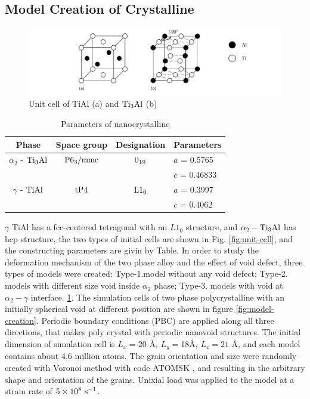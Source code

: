 \documentclass[materials,article,submit,moreauthors,pdftex,10pt,a4paper]{Definitions/mdpi}
\begin{document}
\subsection{Model Creation of Crystalline}
\begin{figure}[ht]
	\centering
	\includegraphics[width=1\linewidth]{img/tial-cell}
	\caption{Unit cell of \rm{TiAl} (a) and $\rm{Ti_3Al}$ (b)}
	\label{fig:tial-cell}
\end{figure}

\begin{table}[ht]
	\caption{Parameters of nanocrystalline}
	\centering
	\begin{tabular}{c c c l}
	\toprule
	\textbf{Phase}			& {Space group}		& {Designation} 		& {Parameters} \\
	\midrule
	$\alpha_2$ - $\rm{Ti_3Al}$		& $\rm P6_3/mmc$ 	& $\rm 0_{19}$ 		& $a$ = 0.5765 \\
		&					&					& $c$ = 0.46833 \\
	$\gamma$ - $\rm{TiAl}$ 		& $\rm tP4$ 		& $\rm L1_0$		& $a$ = 0.3997 \\
		&					&					& $c$ = 0.4062 \\			
	\bottomrule
	\end{tabular} 
	\label{tab:lattice_parameter}
\end{table} 

$\gamma $ TiAl has a fcc-centered tetragonal with an $L1_0$ structure, and $\alpha_2 -\rm Ti_3Al$ has hcp structure, the two types of initial cells are shown in Fig. \ref{fig:unit-cell}, and the constructing parameters are givin by Table. 
In order to study the deformation mechanism of the two phase alloy and the effect of void defect, three types of models were created: Type-1.model without any void defect; Type-2. models with different size void inside $\alpha_2$ phase; Type-3. models with void at $\alpha_2-\gamma$ interface. 
\ref{tab:lattice_parameter}. The simulation cells of two phase polycrystalline with an initially spherical void at different position are shown in figure \ref{fig:model-creation}. 
Periodic boundary conditions (PBC) are applied along all three directions, that makes poly crystal with periodic nanovoid structures. The initial dimension of simulation cell is $L_x =20$ \si{\angstrom}, $L_y = $18\si{\angstrom}, $L_z = 21$ \si{\angstrom}, and each model contains about 4.6 million atoms. The grain orientation and size were randomly created with Voronoi method with code ATOMSK \cite{Hirel2015}, and resulting in the arbitrary shape and orientation of the grains.
Unixial load was applied to the model at a strain rate of $5\times10^8\ \rm{s}^{-1}$.
 
\end{document}
